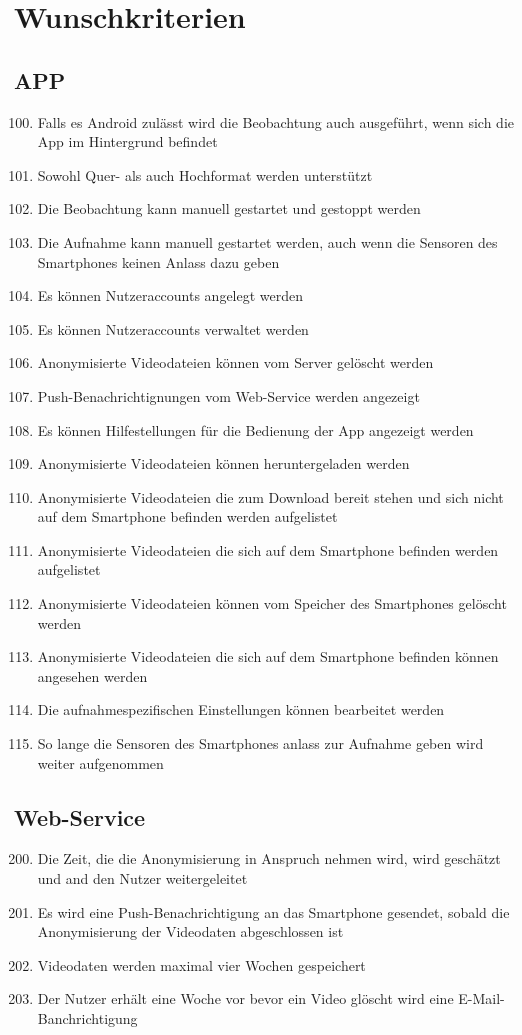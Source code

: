 \section{Wunschkriterien}
\subsection{APP}
	\begin{enumerate}[\bfseries{WK}10]
	\setcounter{enumi}{99}
	\item Falls es Android zulässt wird die Beobachtung auch ausgeführt, wenn sich die App im Hintergrund befindet
	\item Sowohl Quer- als auch Hochformat werden unterstützt
	\item Die Beobachtung kann manuell gestartet und gestoppt werden
	\item Die Aufnahme kann manuell gestartet werden, auch wenn die Sensoren des Smartphones keinen Anlass dazu geben
	\item Es können Nutzeraccounts angelegt werden
	\item Es können Nutzeraccounts verwaltet werden
	\item Anonymisierte Videodateien können vom Server gelöscht werden
	\item Push-Benachrichtignungen vom Web-Service werden angezeigt
	\item Es können Hilfestellungen für die Bedienung der App angezeigt werden
	\item Anonymisierte Videodateien können heruntergeladen werden
	\item Anonymisierte Videodateien die zum Download bereit stehen und sich nicht auf dem Smartphone befinden werden aufgelistet
	\item Anonymisierte Videodateien die sich auf dem Smartphone befinden  werden aufgelistet
	\item Anonymisierte Videodateien können vom Speicher des Smartphones gelöscht werden
	\item Anonymisierte Videodateien die sich auf dem Smartphone befinden können angesehen werden
	\item Die aufnahmespezifischen Einstellungen können bearbeitet werden
	\item So lange die Sensoren des Smartphones anlass zur Aufnahme geben wird weiter aufgenommen
	\end{enumerate}
\subsection{Web-Service}
	\begin{enumerate}[\bfseries{WK}10]
	\setcounter{enumi}{199}
	\item Die Zeit, die die Anonymisierung in Anspruch nehmen wird, wird geschätzt und and den Nutzer weitergeleitet
	\item Es wird eine Push-Benachrichtigung an das Smartphone gesendet, sobald die Anonymisierung der Videodaten abgeschlossen ist
	\item Videodaten werden maximal vier Wochen gespeichert
	\item Der Nutzer erhält eine Woche vor bevor ein Video glöscht wird eine E-Mail-Banchrichtigung
	\end{enumerate}
